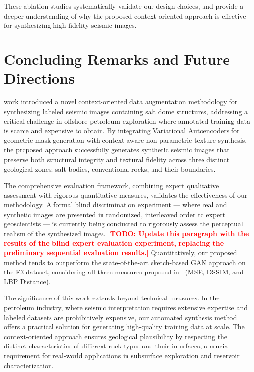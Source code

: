 \documentclass{ieeeaccess}
\begin{document}
These ablation studies systematically validate our design choices, and provide a deeper understanding of why the proposed context-oriented approach is effective for synthesizing high-fidelity seismic images.


\section{Concluding Remarks and Future Directions}
\label{sec:conclusion}

 work introduced a novel context-oriented data augmentation methodology for synthesizing labeled seismic images containing salt dome structures, addressing a critical challenge in offshore petroleum exploration where annotated training data is scarce and expensive to obtain. By integrating Variational Autoencoders for geometric mask generation with context-aware non-parametric texture synthesis, the proposed approach successfully generates synthetic seismic images that preserve both structural integrity and textural fidelity across three distinct geological zones: salt bodies, conventional rocks, and their boundaries.

The comprehensive evaluation framework, combining expert qualitative assessment with rigorous quantitative measures, validates the effectiveness of our methodology. A formal blind discrimination experiment — where real and synthetic images are presented in randomized, interleaved order to expert geoscientists — is currently being conducted to rigorously assess the perceptual realism of the synthesized images. \textcolor{red}{\textbf{[TODO: Update this paragraph with the results of the blind expert evaluation experiment, replacing the preliminary sequential evaluation results.]}} Quantitatively, our proposed method tends to outperform the state-of-the-art sketch-based GAN approach on the F3 dataset, considering all three measures proposed in~\cite{Ferreira2020} (MSE, DSSIM, and LBP Distance). %

The significance of this work extends beyond technical measures. In the petroleum industry, where seismic interpretation requires extensive expertise and labeled datasets are prohibitively expensive, our automated synthesis method offers a practical solution for generating high-quality training data at scale. The context-oriented approach ensures geological plausibility by respecting the distinct characteristics of different rock types and their interfaces, a crucial requirement for real-world applications in subsurface exploration and reservoir characterization.
\end{document}
